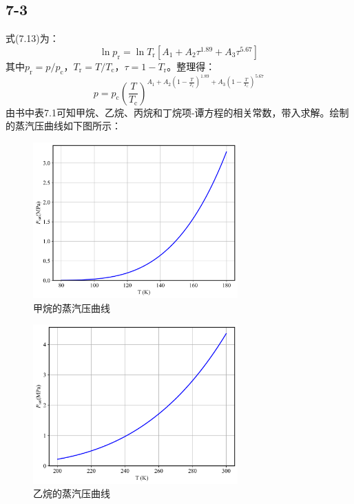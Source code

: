 \documentclass[12pt,a4paper]{article}
\begin{document}
\subsection*{7-3}
式(7.13)为：
\begin{equation*}
    \ln p_\mathrm{r} = \ln T_\mathrm{r}[A_1+A_2 \tau^{1.89}+A_3 \tau^{5.67}]
\end{equation*}
其中$p_\mathrm{r}=p/p_\mathrm{c}$，$T_\mathrm{r}=T/T_\mathrm{c}$，$\tau=1-T_\mathrm{r}$。整理得：
\begin{equation*}
    p = p_\mathrm{c} (\frac{T}{T_\mathrm{c}})^{A_1+A_2 (1-\frac{T}{T_\mathrm{c}})^{1.89}+A_3 (1-\frac{T}{T_\mathrm{c}})^{5.67}}
\end{equation*}
由书中表7.1可知甲烷、乙烷、丙烷和丁烷项-谭方程的相关常数，带入求解。绘制的蒸汽压曲线如下图所示：
\begin{figure}[H]
    \centering
    \includegraphics[width=0.7\textwidth]{../chp7/figs/甲烷.png}
    \caption{甲烷的蒸汽压曲线}
\end{figure}
\begin{figure}[H]
    \centering
    \includegraphics[width=0.7\textwidth]{../chp7/figs/乙烷.png}
    \caption{乙烷的蒸汽压曲线}
\end{figure}
\end{document}
